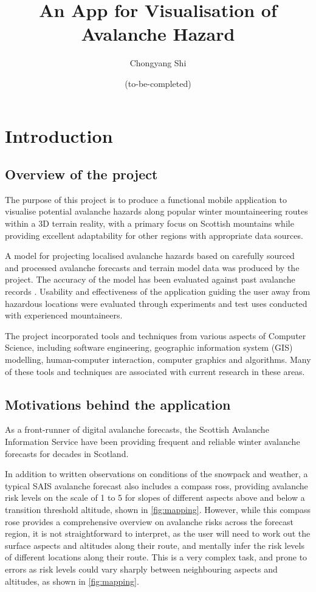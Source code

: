\documentclass[openany]{UoYCSproject}
\title{An App for Visualisation of Avalanche Hazard}
\author{Chongyang Shi}
\date{(to-be-completed)}
\begin{document}
{\let\cleardoublepage\clearpage 
    \maketitle
}

\chapter{Introduction}

\section{Overview of the project}

The purpose of this project is to produce a functional mobile application to visualise potential avalanche hazards along popular winter mountaineering routes within a 3D terrain reality, with a primary focus on Scottish mountains while providing excellent adaptability for other regions with appropriate data sources. 

A model for projecting localised avalanche hazards based on carefully sourced and processed avalanche forecasts \cite{sais} and terrain model data \cite{os-5} was produced by the project. The accuracy of the model has been evaluated against past avalanche records \cite[pp. 143-151]{scottish-avalanches}\cite{sais-map}. Usability and effectiveness of the application guiding the user away from hazardous locations were evaluated through experiments and test uses conducted with experienced mountaineers.

The project incorporated tools and techniques from various aspects of Computer Science, including software engineering, geographic information system (GIS) modelling, human-computer interaction, computer graphics and algorithms. Many of these tools and techniques are associated with current research in these areas.

\section{Motivations behind the application}

As a front-runner of digital avalanche forecasts, the Scottish Avalanche Information Service \cite{sais} have been providing frequent and reliable winter avalanche forecasts for decades in Scotland.

In addition to written observations on conditions of the snowpack and weather, a typical SAIS avalanche forecast also includes a compass ross, providing avalanche risk levels on the scale of 1 to 5 for slopes of different aspects above and below a transition threshold altitude, shown in \ref{fig:mapping}. However, while this compass rose provides a comprehensive overview on avalanche risks across the forecast region, it is not straightforward to interpret, as the user will need to work out the surface aspects and altitudes along their route, and mentally infer the risk levels of different locations along their route. This is a very complex task, and prone to errors as risk levels could vary sharply between neighbouring aspects and altitudes, as shown in \ref{fig:mapping}.
\end{document}
